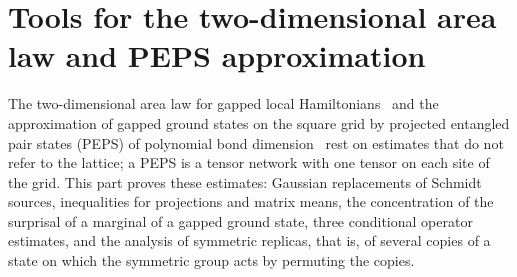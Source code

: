 \part{Tools for the two-dimensional area law and PEPS approximation}
\label{part:area_law_tools}

The two-dimensional area law for gapped local
Hamiltonians~\cite{OpenAI2026AreaLaw} and the approximation of gapped ground
states on the square grid by projected entangled pair states (PEPS) of
polynomial bond dimension~\cite{OpenAI2026PolynomialPEPS} rest on estimates
that do not refer to the lattice; a PEPS is a tensor network with one tensor on
each site of the grid. This part proves these estimates: Gaussian replacements
of Schmidt sources, inequalities for projections and matrix means, the
concentration of the surprisal of a marginal of a gapped ground state, three
conditional operator estimates, and the analysis of symmetric replicas, that
is, of several copies of a state on which the symmetric group acts by permuting
the copies.
